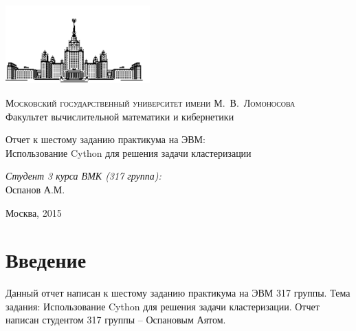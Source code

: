 \documentclass[12pt, a4paper]{article}
\begin{document}
	\thispagestyle{empty}

	\begin{singlespace}
	\begin{titlepage}
		\begin{center}
			\includegraphics[height = 3cm]{msu.png}

			{\scshape Московский государственный университет имени М.~В.~Ломоносова}\\
			Факультет вычислительной математики и кибернетики\\
			\centerline{\hfill\hrulefill\hrulefill\hrulefill\hrulefill\hfill}

			\vfill

			{\LARGE Отчет к шестому заданию практикума на ЭВМ: \\ Использование Cython для решения задачи кластеризации}

			\vspace{1cm}

		\end{center}

		\vfill
		\begin{flushright}
			\textit{Студент 3 курса ВМК (317 группа):}\\
				Оспанов А.М.

			\vspace{5mm}

		\end{flushright}

		\vfill

		\begin{center}
		Москва, 2015
		\end{center}
	\end{titlepage}
	\end{singlespace}

	\tableofcontents


	\newpage
	\section{Введение}
		Данный отчет написан к шестому заданию практикума на ЭВМ 317 группы. Тема задания: Использование Cython для решения задачи кластеризации. Отчет написан студентом 317 группы -- Оспановым Аятом.
\end{document}
